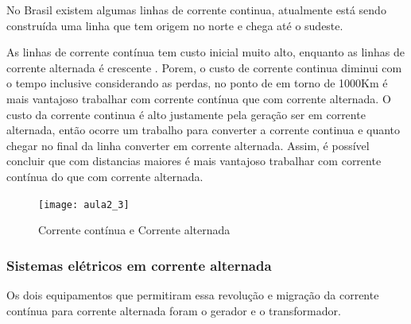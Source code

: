 No Brasil existem algumas linhas de corrente continua, atualmente
está sendo construída uma linha que tem origem no norte e chega até
o sudeste.

As linhas de corrente contínua tem custo inicial muito alto, enquanto
as linhas de corrente alternada é crescente . Porem, o custo
de corrente continua diminui com o tempo inclusive considerando as
perdas, no ponto de em torno de 1000Km é mais vantajoso trabalhar
com corrente contínua que com corrente alternada. O custo da corrente
continua é alto justamente pela geração ser em corrente alternada,
então ocorre um trabalho para converter a corrente continua e quanto
chegar no final da linha converter em corrente alternada. Assim, é
possível concluir que com distancias maiores é mais vantajoso trabalhar
com corrente contínua do que com corrente alternada.
\begin{figure}[H]
\begin{centering}
\texttt{[image: aula2\_3]}\protect\caption{\label{fig:aula2_3} Corrente contínua e Corrente alternada }
\end{centering}

\end{figure}

\subsubsection{Sistemas elétricos em corrente alternada}

Os dois equipamentos que permitiram essa revolução e migração da corrente contínua para corrente alternada foram o gerador e o transformador.

